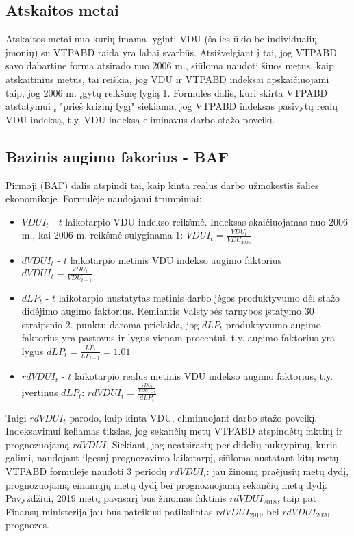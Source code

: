 \documentclass[titlepage, 11pt]{article}
\begin{document}
\subsection{Atskaitos metai}
Atskaitos metai nuo kurių imama lyginti VDU (šalies ūkio be individualių įmonių) su  VTPABD raida yra labai svarbūs. Atsižvelgiant į tai, jog VTPABD savo dabartine forma atsirado nuo 2006 m., siūloma naudoti šiuos metus, kaip atskaitinius metus, tai reiškia, jog VDU ir VTPABD indeksai apskaičiuojami taip, jog 2006 m. įgytų reikšmę lygią 1. 
Formulės dalis, kuri skirta VTPABD atstatymui į "prieš krizinį lygį" siekiama, jog VTPABD indeksas pasivytų realų VDU indeksą, t.y. VDU indeksą eliminavus darbo stažo poveikį.

\subsection{Bazinis augimo fakorius - BAF}
Pirmoji (BAF) dalis atspindi tai, kaip kinta realus darbo užmokestis šalies ekonomikoje. Formulėje naudojami trumpiniai:

\begin{itemize}
\item $VDUI_{t}$ - $t$ laikotarpio VDU indekso reikšmė. Indeksas skaičiuojamas nuo 2006 m., kai 2006 m. reikšmė sulyginama 1: $VDUI_{t}=\frac{VDU_{t}}{VDU_{2006}}$
\item $dVDUI_t$ - $t$ laikotarpio metinis VDU indekso augimo faktorius $dVDUI_{t}=\frac{VDU_{t}}{VDU_{t-1}}$
\item $dLP_t$ - $t$ laikotarpio nustatytas metinis darbo jėgos produktyvumo dėl stažo didėjimo augimo faktorius. Remiantis Valstybės tarnybos įstatymo 30 straipsnio 2. punktu daroma prielaida, jog $dLP_t$ produktyvumo augimo faktorius yra pastovus ir lygus vienam procentui, t.y. augimo faktorius yra lygus $dLP_t=\frac{LP_t}{LP_{t-1}}=1.01$
\item $rdVDUI_t$ - $t$ laikotarpio realus metinis VDU indekso augimo faktorius, t.y.  įvertinus $dLP_t$: $rdVDUI_t=\frac{\frac{VDU_{t}}{VDU_{t-1}}}{dLP_t}$
\end{itemize}

Taigi $rdVDUI_t$ parodo, kaip kinta VDU, eliminuojant darbo stažo poveikį. Indeksavimui keliamas tikslas, jog sekančių metų VTPABD atspindėtų  faktinį ir prognozuojamą $rdVDUI$. Siekiant, jog neatsirastų per didelių nukrypimų, kurie galimi, naudojant ilgesnį prognozavimo laikotarpį, siūloma nustatant kitų metų VTPABD formulėje naudoti 3 periodų $rdVDUI_t$: jau žinomą praėjusių metų dydį, prognozuojamą einamųjų metų dydį bei prognozuojamą sekančių metų dydį. Pavyzdžiui, 2019 metų pavasarį bus žinomas faktinis $rdVDUI_{2018}$, taip pat Finansų ministerija jau bus pateikusi patikslintas $rdVDUI_{2019}$ bei $rdVDUI_{2020}$ prognozes. 
\end{document}
